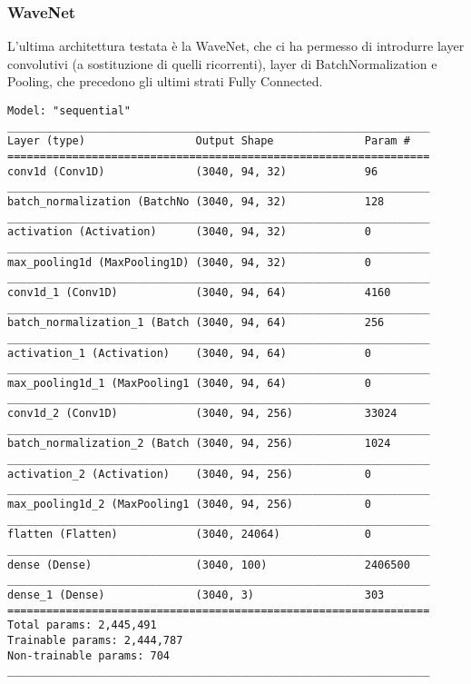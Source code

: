\subsubsection*{WaveNet}
L'ultima architettura testata è la WaveNet\cite{DBLP:journals/corr/OordDZSVGKSK16}, che ci ha permesso di introdurre layer convolutivi (a sostituzione di quelli ricorrenti), layer di BatchNormalization e Pooling, che precedono gli ultimi strati Fully Connected.
\begin{lstlisting}[style=arch]
Model: "sequential"
_________________________________________________________________
Layer (type)                 Output Shape              Param #   
=================================================================
conv1d (Conv1D)              (3040, 94, 32)            96        
_________________________________________________________________
batch_normalization (BatchNo (3040, 94, 32)            128       
_________________________________________________________________
activation (Activation)      (3040, 94, 32)            0         
_________________________________________________________________
max_pooling1d (MaxPooling1D) (3040, 94, 32)            0         
_________________________________________________________________
conv1d_1 (Conv1D)            (3040, 94, 64)            4160      
_________________________________________________________________
batch_normalization_1 (Batch (3040, 94, 64)            256       
_________________________________________________________________
activation_1 (Activation)    (3040, 94, 64)            0         
_________________________________________________________________
max_pooling1d_1 (MaxPooling1 (3040, 94, 64)            0         
_________________________________________________________________
conv1d_2 (Conv1D)            (3040, 94, 256)           33024     
_________________________________________________________________
batch_normalization_2 (Batch (3040, 94, 256)           1024      
_________________________________________________________________
activation_2 (Activation)    (3040, 94, 256)           0         
_________________________________________________________________
max_pooling1d_2 (MaxPooling1 (3040, 94, 256)           0         
_________________________________________________________________
flatten (Flatten)            (3040, 24064)             0         
_________________________________________________________________
dense (Dense)                (3040, 100)               2406500   
_________________________________________________________________
dense_1 (Dense)              (3040, 3)                 303       
=================================================================
Total params: 2,445,491
Trainable params: 2,444,787
Non-trainable params: 704
_________________________________________________________________
\end{lstlisting}
